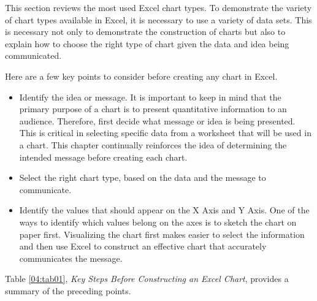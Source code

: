 This section reviews the most used Excel chart types. To demonstrate the variety of chart types available in Excel, it is necessary to use a variety of data sets. This is necessary not only to demonstrate the construction of charts but also to explain how to choose the right type of chart given the data and idea being communicated.

Here are a few key points to consider before creating any chart in Excel.

\begin{itemize}
	\item Identify the idea or message. It is important to keep in mind that the primary purpose of a chart is to present quantitative information to an audience. Therefore, first decide what message or idea is being presented. This is critical in selecting specific data from a worksheet that will be used in a chart. This chapter continually reinforces the idea of determining the intended message before creating each chart.
	\item Select the right chart type, based on the data and the message to communicate.
	\item Identify the values that should appear on the X Axis and Y Axis. One of the ways to identify which values belong on the axes is to sketch the chart on paper first. Visualizing the chart first makes easier to select the information and then use Excel to construct an effective chart that accurately communicates the message. 
\end{itemize}

Table \ref{04:tab01}, \textit{Key Steps Before Constructing an Excel Chart}, provides a summary of the preceding points.

